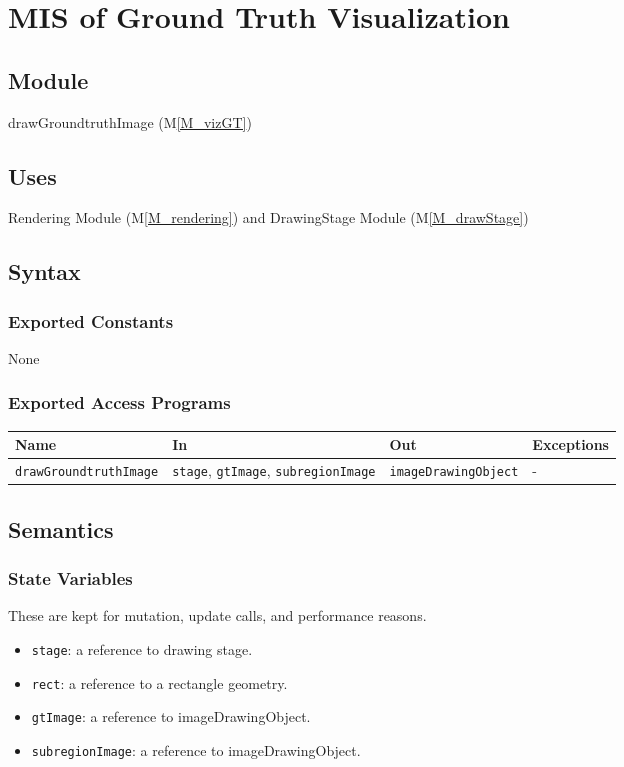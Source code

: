 \documentclass[12pt, titlepage]{article}
\newcommand{\mref}[1]{M\ref{#1}}
\newcommand{\mrefp}[1]{(\mref{#1})}
\newcommand{\mreff}[1]{Module \mrefp{#1}}
\newcommand{\code}[1]{\texttt{#1}}
\begin{document}
\newpage


\section{MIS of Ground Truth Visualization} \label{MS_vizGT}

\subsection{Module}
drawGroundtruthImage \mrefp{M_vizGT}

\subsection{Uses}
Rendering \mreff{M_rendering} and DrawingStage \mreff{M_drawStage}

\subsection{Syntax}

\subsubsection{Exported Constants}
None
\subsubsection{Exported Access Programs}

\begin{center}
\begin{tabular}{p{5cm} p{4cm} p{4cm} p{2cm}}
\hline
\textbf{Name} & \textbf{In} & \textbf{Out} & \textbf{Exceptions} \\
\hline
\code{drawGroundtruthImage} & \code{stage}, \code{gtImage}, \code{subregionImage}
  & \code{imageDrawingObject} & - \\
\hline
\end{tabular}
\end{center}

\subsection{Semantics}

\subsubsection{State Variables}
These are kept for mutation, update calls, and performance reasons.
\begin{itemize}
  \item \code{stage}: a reference to drawing stage.
  \item \code{rect}: a reference to a rectangle geometry.
  \item \code{gtImage}: a reference to imageDrawingObject.
  \item \code{subregionImage}: a reference to imageDrawingObject.
\end{itemize}
\end{document}
